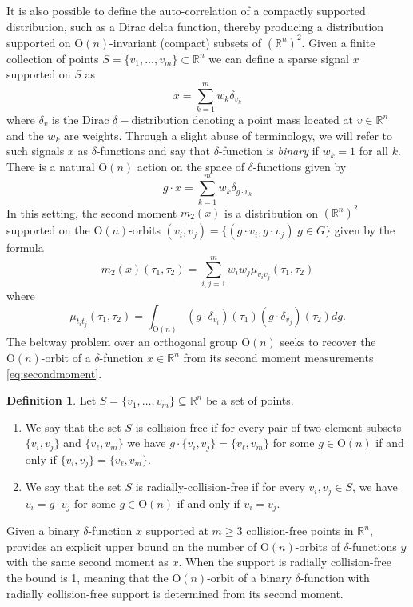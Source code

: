 \documentclass{article}
\theoremstyle{definition}
\newtheorem{Definition}{Definition}
\renewcommand{\r}{\mathbb{R}}
\renewcommand{\o}{\mathcal{O}}
\renewcommand{\|}{|}
\renewcommand{\o}[1]{\overline{#1}}
\renewcommand{\O}{\mathrm{O}}
\begin{document}
It is also possible to define the auto-correlation of a compactly supported distribution, such as a Dirac delta function, thereby producing a distribution supported on $\O(n)$-invariant (compact) subsets of $(\r^n)^2$.  Given a finite collection of points $S= \{v_1,\dots, v_m\} \subset \r^n$ we can define a sparse signal $x$ supported on $S$ as 
\begin{equation}\label{eq:deltafunc}
x = \sum_{k=1}^m w_k\delta_{v_k}    
\end{equation}
where $\delta_{v}$ is the Dirac $\delta-$distribution denoting a point mass located at $v \in \r^n$ and
the $w_k$ are weights. Through a slight abuse of terminology, we will refer to such signals $x$ as $\delta$-functions
and say that $\delta$-function is {\em binary} if $w_k = 1$ for all $k$. There is a natural $\O(n)$ action on the space of $\delta$-functions given by $$g\cdot x = \sum_{k=1}^m w_k\delta_{g\cdot v_k}$$
In this setting, the second moment $m_2(x)$ is a distribution on $(\r^n)^2$ supported on the $\O(n)$-orbits $\o{(v_i, v_j)} = \{(g\cdot v_i, g\cdot v_j) | g\in G\}$ given by the formula 
\begin{equation}\label{eq:secondmoment}
m_2(x)(\tau_1, \tau_2) = \sum_{i,j = 1}^m  w_iw_j\mu_{v_iv_j}(\tau_1, \tau_2)    
\end{equation}
where $$\mu_{t_it_j}(\tau_1, \tau_2) = \int_{\O(n)} (g\cdot \delta_{v_i})(\tau_1)(g\cdot \delta_{v_j})(\tau_2) dg.$$
The beltway problem over an orthogonal group $\O(n)$ seeks to recover the $\O(n)$-orbit of a $\delta$-function $x \in \r^n$ from its second moment measurements \eqref{eq:secondmoment}.

\begin{Definition}{\cite[Definition 3.1]{bendory2024beltway}} \label{def:collisionfree}
    Let $S = \{v_1,\dots, v_m\} \subseteq \r^n$ be a set of points.
    \begin{enumerate}
        \item[a.] We say that the set $S$ is collision-free if for every pair of two-element subsets $\{v_i, v_j\}$ and $\{v_\ell, v_m\}$ we have $g\cdot \{v_i, v_j\} = \{v_\ell, v_m\}$ for some $g \in \O(n)$ if and only if $\{v_i, v_j\} =  \{v_\ell, v_m\}$.
        \item[b.] We say that the set $S$ is radially-collision-free if for every $v_i, v_j \in S$, we have $v_i = g\cdot v_j$ for some $g \in \O(n)$ if and only if $v_i = v_j$.
    \end{enumerate}
\end{Definition}
Given a binary $\delta$-function $x$ supported at $m \geq 3$ collision-free points in $\r^n$, \cite[Theorem 3.2]{bendory2024beltway} provides an explicit upper bound on the number of $\O(n)$-orbits of $\delta$-functions $y$ with the same second moment as $x$. 
When the support is radially collision-free the bound is 1, meaning that the $\O(n)$-orbit of a binary $\delta$-function with radially collision-free support is determined from its second moment.\\
\end{document}
